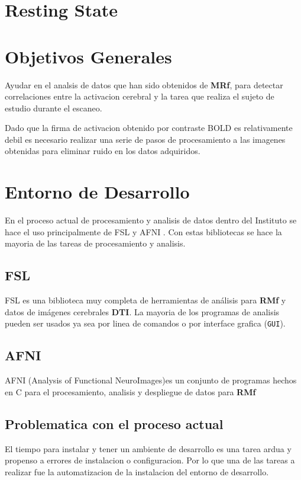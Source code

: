 \documentclass{article}
\begin{document}
\section{Resting State}

\section{Objetivos Generales}

Ayudar en el analsis de datos que han sido obtenidos de \textbf{MRf}, para detectar correlaciones entre la activacion cerebral y la tarea que realiza el sujeto de estudio durante el escaneo.

Dado que la firma de activacion obtenido por contraste BOLD es relativamente debil es necesario realizar una serie de pasos de procesamiento a las imagenes obtenidas para eliminar ruido en los datos adquiridos.

\section{Entorno de Desarrollo}

En el proceso actual de procesamiento y analisis de datos dentro del Instituto se hace el uso principalmente de FSL y AFNI . Con estas bibliotecas se hace la mayoria de las tareas de procesamiento y analisis.

\subsection{FSL}

FSL es una biblioteca muy completa de herramientas de análisis para \textbf{RMf} y datos de imágenes cerebrales
\textbf{DTI}. La mayoria de los programas de analisis pueden ser usados ya sea por linea de comandos o por interface grafica (\texttt{GUI}).

\subsection{AFNI}

AFNI (Analysis of Functional NeuroImages)es un conjunto de programas hechos en C para el procesamiento, analisis y despliegue de datos para \textbf{RMf}

\subsection{Problematica con el  proceso actual}
El tiempo para instalar y tener un ambiente de desarrollo es una tarea ardua y propenso a errores de instalacion o configuracion. Por lo que una de las tareas a realizar fue la automatizacion de la instalacion del entorno de desarrollo.
\end{document}
